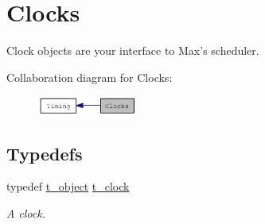 \hypertarget{group__clocks}{
\section{Clocks}
\label{group__clocks}
}


Clock objects are your interface to Max’s scheduler.  


Collaboration diagram for Clocks:\nopagebreak
\begin{figure}[H]
\begin{center}
\leavevmode
\includegraphics[width=93pt]{group__clocks}
\end{center}
\end{figure}
\subsection*{Typedefs}
\begin{DoxyCompactItemize}
\item 
\hypertarget{group__clocks_ga09c0580122113b4db2517ff8e7c8b0f2}{
typedef \hyperlink{structt__object}{t\_\-object} \hyperlink{group__clocks_ga09c0580122113b4db2517ff8e7c8b0f2}{t\_\-clock}}
\label{group__clocks_ga09c0580122113b4db2517ff8e7c8b0f2}

\begin{DoxyCompactList}\small\item\em A clock. \item\end{DoxyCompactList}\end{DoxyCompactItemize}
